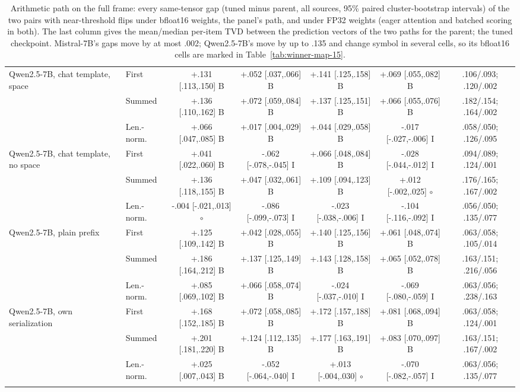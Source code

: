 \begin{table}[t]
\begin{tabular}{@{}llccccc@{}}
\addlinespace[1pt]
Qwen2.5-7B, chat template, space & First & +.131 [.113,.150] B & +.052 [.037,.066] B & +.141 [.125,.158] B & +.069 [.055,.082] B & .106/.093; .120/.002 \\
 & Summed & +.136 [.110,.162] B & +.072 [.059,.084] B & +.137 [.125,.151] B & +.066 [.055,.076] B & .182/.154; .164/.002 \\
 & Len.-norm. & +.066 [.047,.085] B & +.017 [.004,.029] B & +.044 [.029,.058] B & -.017 [-.027,-.006] I & .058/.050; .126/.095 \\
\addlinespace[1pt]
Qwen2.5-7B, chat template, no space & First & +.041 [.022,.060] B & -.062 [-.078,-.045] I & +.066 [.048,.084] B & -.028 [-.044,-.012] I & .094/.089; .124/.001 \\
 & Summed & +.136 [.118,.155] B & +.047 [.032,.061] B & +.109 [.094,.123] B & +.012 [-.002,.025] $\circ$ & .176/.165; .167/.002 \\
 & Len.-norm. & -.004 [-.021,.013] $\circ$ & -.086 [-.099,-.073] I & -.023 [-.038,-.006] I & -.104 [-.116,-.092] I & .056/.050; .135/.077 \\
\addlinespace[1pt]
Qwen2.5-7B, plain prefix & First & +.125 [.109,.142] B & +.042 [.028,.055] B & +.140 [.125,.156] B & +.061 [.048,.074] B & .063/.058; .105/.014 \\
 & Summed & +.186 [.164,.212] B & +.137 [.125,.149] B & +.143 [.128,.158] B & +.065 [.052,.078] B & .163/.151; .216/.056 \\
 & Len.-norm. & +.085 [.069,.102] B & +.066 [.058,.074] B & -.024 [-.037,-.010] I & -.069 [-.080,-.059] I & .063/.056; .238/.163 \\
\addlinespace[1pt]
Qwen2.5-7B, own serialization & First & +.168 [.152,.185] B & +.072 [.058,.085] B & +.172 [.157,.188] B & +.081 [.068,.094] B & .063/.058; .124/.001 \\
 & Summed & +.201 [.181,.220] B & +.124 [.112,.135] B & +.177 [.163,.191] B & +.083 [.070,.097] B & .163/.151; .167/.002 \\
 & Len.-norm. & +.025 [.007,.043] B & -.052 [-.064,-.040] I & +.013 [-.004,.030] $\circ$ & -.070 [-.082,-.057] I & .063/.056; .135/.077 \\
\addlinespace[1pt]
\bottomrule
\end{tabular}
\caption{Arithmetic path on the full frame: every same-tensor gap (tuned minus parent, all sources, 95\% paired cluster-bootstrap intervals) of the two pairs with near-threshold flips under bfloat16 weights, the panel's path, and under FP32 weights (eager attention and batched scoring in both). The last column gives the mean/median per-item TVD between the prediction vectors of the two paths for the parent; the tuned checkpoint. Mistral-7B's gaps move by at most .002; Qwen2.5-7B's move by up to .135 and change symbol in several cells, so its bfloat16 cells are marked in Table~\ref{tab:winner-map-15}.}
\label{tab:fp32}
\end{table}
